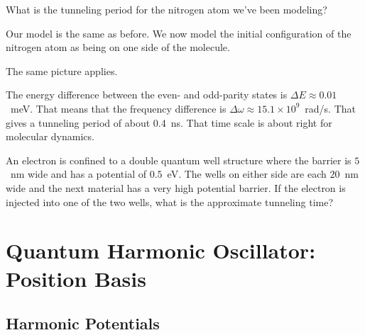 \begin{example}
What is the tunneling period for the nitrogen atom we've been modeling?

\model Our model is the same as before. We now model the initial configuration of the nitrogen atom as being on one side of the molecule.

\vis The same picture applies.

\sol The energy difference between the even- and odd-parity states is $\Delta E \approx 0.01$~meV. That means that the frequency difference is $\Delta\omega \approx 15.1\times10^{9}$~rad/s. That gives a tunneling period of about 0.4~ns. That time scale is about right for molecular dynamics.

\end{example}

\begin{exercise}
An electron is confined to a double quantum well structure where the barrier is $5$~nm wide and has a potential of $0.5$~eV. The wells on either side are each $20$~nm wide and the next material has a very high potential barrier. If the electron is injected into one of the two wells, what is the approximate tunneling time?
\end{exercise}



\chapter{Quantum Harmonic Oscillator: Position Basis}

\section{Harmonic Potentials}

